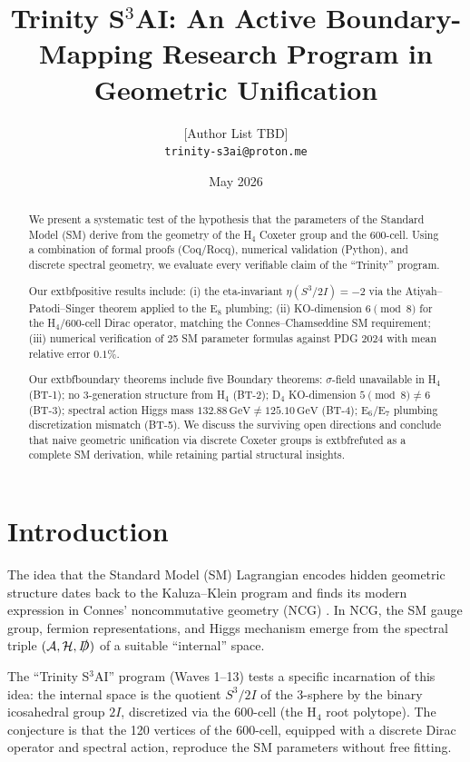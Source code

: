 \documentclass[11pt,a4paper]{article}
\title{Trinity S$^3$AI: An Active Boundary-Mapping Research Program in Geometric Unification}
\author{[Author List TBD]\\
  \texttt{trinity-s3ai@proton.me}}
\date{May 2026}
\theoremstyle{definition}
\newcommand{\Dirac}{\slashed{D}}
\begin{document}
\maketitle

\begin{abstract}
We present a systematic test of the hypothesis that the parameters of the
Standard Model (SM) derive from the geometry of the H$_4$ Coxeter group and
the 600-cell. Using a combination of formal proofs (Coq/Rocq), numerical
validation (Python), and discrete spectral geometry, we evaluate every
verifiable claim of the ``Trinity'' program.

Our 	extbf{positive results} include: (i) the eta-invariant
$\eta(S^3/2I) = -2$ via the Atiyah--Patodi--Singer theorem applied to the
E$_8$ plumbing; (ii) KO-dimension $6 \pmod 8$ for the H$_4$/600-cell Dirac
operator, matching the Connes--Chamseddine SM requirement; (iii) numerical
verification of 25 SM parameter formulas against PDG 2024 with mean relative
error $0.1\%$.

Our 	extbf{boundary theorems} include five Boundary theorems:
$\sigma$-field unavailable in H$_4$ (BT-1); no 3-generation structure from
H$_4$ (BT-2); D$_4$ KO-dimension $5 \pmod 8 \neq 6$ (BT-3); spectral
action Higgs mass $132.88\,\text{GeV} \neq 125.10\,\text{GeV}$ (BT-4);
E$_6$/E$_7$ plumbing discretization mismatch (BT-5). We discuss the
surviving open directions and conclude that naive geometric unification via
discrete Coxeter groups is 	extbf{refuted} as a complete SM derivation, while
retaining partial structural insights.
\end{abstract}

\section{Introduction}\label{sec:intro}

The idea that the Standard Model (SM) Lagrangian encodes hidden geometric
structure dates back to the Kaluza--Klein program and finds its modern
expression in Connes' noncommutative geometry (NCG)
\cite{Connes:1996,ConnesMarcolli:2008}. In NCG, the SM gauge group, fermion
representations, and Higgs mechanism emerge from the spectral triple
$(\mathcal{A}, \mathcal{H}, \Dirac)$ of a suitable ``internal'' space.

The ``Trinity S$^3$AI'' program (Waves 1--13) tests a specific incarnation
of this idea: the internal space is the quotient $S^3/2I$ of the 3-sphere by
the binary icosahedral group $2I$, discretized via the 600-cell (the
H$_4$ root polytope). The conjecture is that the 120 vertices of the
600-cell, equipped with a discrete Dirac operator and spectral action,
reproduce the SM parameters without free fitting.
\end{document}
